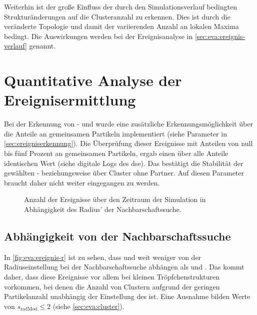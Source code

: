 Weiterhin ist der große Einfluss der durch den Simulationsverlauf bedingten Strukturänderungen auf die Clusteranzahl zu erkennen. Dies ist durch die veränderte Topologie und damit der variierenden Anzahl an lokalen Maxima bedingt. Die Auswirkungen werden bei der Ereignisanalyse in \autoref{sec:eva:ereignis-verlauf} genannt.

\section{Quantitative Analyse der Ereignisermittlung}\label{eva:quantitativ}

Bei der Erkennung von - und  wurde eine zusätzliche Erkennungsmöglichkeit über die Anteile an gemeinsamen Partikeln implementiert (siehe Parameter  in \autoref{sec:ereigniserkennung}). Die Überprüfung dieser Ereignisse mit Anteilen von null bis fünf Prozent an gemeinsamen Partikeln, ergab einen über alle Anteile identischen Wert (siehe digitale Logs des \gls{dse}). Das bestätigt die Stabilität der gewählten - beziehungsweise  über Cluster ohne Partner. Auf diesen Parameter braucht daher nicht weiter eingegangen zu werden.

\begin{figure}
	{\caption{Anzahl der Ereignisse über den Zeitraum der Simulation in Abhängigkeit des Radius' der Nachbarschaftssuche.}\label{fig:eva:ereignis-r}}
\end{figure}

\subsection*{Abhängigkeit von der Nachbarschaftssuche}
In \autoref{fig:eva:ereignis-r} ist zu sehen, dass  und  weit weniger von der Radiuseinstellung bei der Nachbarschaftssuche abhängen als  und . Das kommt daher, dass diese Ereignisse vor allem bei kleinen Tröpfchenstrukturen vorkommen, bei denen die Anzahl von Clustern aufgrund der geringen Partikelanzahl unabhängig der Einstellung des   ist. Eine Ausnahme bilden Werte von $s_\text{radMod} \le 2$ (siehe \autoref{sec:eva:cluster}).

